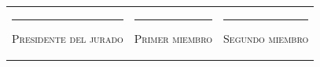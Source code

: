 \documentclass{evaluacion}
\begin{document}
\vspace{1.6em}
{\small
\begin{tabularx}{\textwidth}{@{}X X X@{}}
  \centering\rule{0.85\linewidth}{0.4pt}\par
  \centering\scshape Presidente del jurado &
  \centering\rule{0.85\linewidth}{0.4pt}\par
  \centering\scshape Primer miembro &
  \centering\rule{0.85\linewidth}{0.4pt}\par
  \centering\scshape Segundo miembro
  \tabularnewline
\end{tabularx}}

\findelexamen
\end{document}
